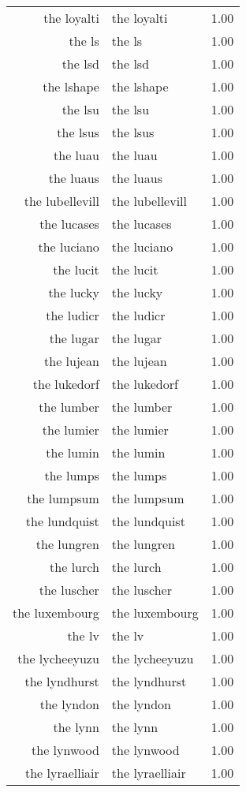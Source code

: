 \begin{table}[ht]
\begin{tabular}{rlr}
  the loyalti & the loyalti & 1.00 \\ 
  the ls & the ls & 1.00 \\ 
  the lsd & the lsd & 1.00 \\ 
  the lshape & the lshape & 1.00 \\ 
  the lsu & the lsu & 1.00 \\ 
  the lsus & the lsus & 1.00 \\ 
  the luau & the luau & 1.00 \\ 
  the luaus & the luaus & 1.00 \\ 
  the lubellevill & the lubellevill & 1.00 \\ 
  the lucases & the lucases & 1.00 \\ 
  the luciano & the luciano & 1.00 \\ 
  the lucit & the lucit & 1.00 \\ 
  the lucky & the lucky & 1.00 \\ 
  the ludicr & the ludicr & 1.00 \\ 
  the lugar & the lugar & 1.00 \\ 
  the lujean & the lujean & 1.00 \\ 
  the lukedorf & the lukedorf & 1.00 \\ 
  the lumber & the lumber & 1.00 \\ 
  the lumier & the lumier & 1.00 \\ 
  the lumin & the lumin & 1.00 \\ 
  the lumps & the lumps & 1.00 \\ 
  the lumpsum & the lumpsum & 1.00 \\ 
  the lundquist & the lundquist & 1.00 \\ 
  the lungren & the lungren & 1.00 \\ 
  the lurch & the lurch & 1.00 \\ 
  the luscher & the luscher & 1.00 \\ 
  the luxembourg & the luxembourg & 1.00 \\ 
  the lv & the lv & 1.00 \\ 
  the lycheeyuzu & the lycheeyuzu & 1.00 \\ 
  the lyndhurst & the lyndhurst & 1.00 \\ 
  the lyndon & the lyndon & 1.00 \\ 
  the lynn & the lynn & 1.00 \\ 
  the lynwood & the lynwood & 1.00 \\ 
  the lyraelliair & the lyraelliair & 1.00 \\ 

\end{tabular}
\end{table}
